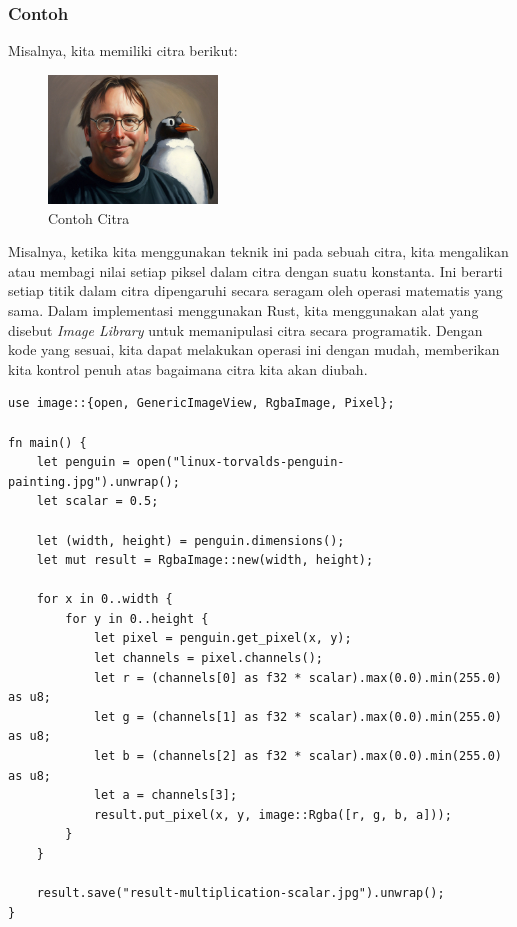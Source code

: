\documentclass[a4paper,12pt,openany]{book}
\begin{document}
\subsubsection{Contoh}
Misalnya, kita memiliki citra berikut:

\begin{figure}[H]
    \centering
    \includegraphics[width=0.4\textwidth]{./image/arithmetic/linux-torvalds-penguin-painting.jpg}
    \caption{Contoh Citra}
\end{figure}

Misalnya, ketika kita menggunakan teknik ini pada sebuah citra, kita mengalikan atau membagi nilai setiap piksel dalam citra dengan suatu konstanta. Ini berarti setiap titik dalam citra dipengaruhi secara seragam oleh operasi matematis yang sama. Dalam implementasi menggunakan Rust, kita menggunakan alat yang disebut \textit{Image Library} untuk memanipulasi citra secara programatik. Dengan kode yang sesuai, kita dapat melakukan operasi ini dengan mudah, memberikan kita kontrol penuh atas bagaimana citra kita akan diubah.

\begin{lstlisting}
use image::{open, GenericImageView, RgbaImage, Pixel};

fn main() {
    let penguin = open("linux-torvalds-penguin-painting.jpg").unwrap();
    let scalar = 0.5;

    let (width, height) = penguin.dimensions();
    let mut result = RgbaImage::new(width, height);

    for x in 0..width {
        for y in 0..height {
            let pixel = penguin.get_pixel(x, y);
            let channels = pixel.channels();
            let r = (channels[0] as f32 * scalar).max(0.0).min(255.0) as u8;
            let g = (channels[1] as f32 * scalar).max(0.0).min(255.0) as u8;
            let b = (channels[2] as f32 * scalar).max(0.0).min(255.0) as u8;
            let a = channels[3];
            result.put_pixel(x, y, image::Rgba([r, g, b, a]));
        }
    }

    result.save("result-multiplication-scalar.jpg").unwrap();
}
\end{lstlisting}
\end{document}
